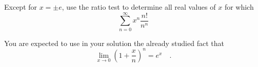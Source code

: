 Except for $x=\pm e$, use the ratio test to determine all real values of $x$ for which 
\[
\sum_{n=0}^{\infty}x^n\frac{n!}{n^n}
\]

You are expected to use in your solution the already studied fact that 
\[
\lim_{x\to 0}\left(1+\frac{x}{n}\right)^n=e^x\quad .
\]